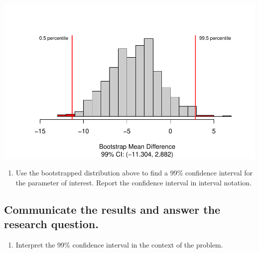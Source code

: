 \documentclass[
]{report}
\newenvironment{Shaded}{\begin{snugshade}}{\end{snugshade}}
\newcommand{\CommentTok}[1]{\textcolor[rgb]{0.56,0.35,0.01}{\textit{#1}}}
\newcommand{\DataTypeTok}[1]{\textcolor[rgb]{0.13,0.29,0.53}{#1}}
\newcommand{\DecValTok}[1]{\textcolor[rgb]{0.00,0.00,0.81}{#1}}
\newcommand{\FloatTok}[1]{\textcolor[rgb]{0.00,0.00,0.81}{#1}}
\newcommand{\KeywordTok}[1]{\textcolor[rgb]{0.13,0.29,0.53}{\textbf{#1}}}
\newcommand{\NormalTok}[1]{#1}
\newcommand{\OperatorTok}[1]{\textcolor[rgb]{0.81,0.36,0.00}{\textbf{#1}}}
\providecommand{\tightlist}{%
  \setlength{\itemsep}{0pt}\setlength{\parskip}{0pt}}
\begin{document}
\begin{Shaded}
\end{Shaded}

\begin{center}\includegraphics[width=0.7\linewidth]{08-paired_files/figure-latex/unnamed-chunk-6-1} \end{center}

\begin{enumerate}
\def\labelenumi{\arabic{enumi}.}
\setcounter{enumi}{18}
\tightlist
\item
  Use the bootstrapped distribution above to find a 99\% confidence interval for the parameter of interest. Report the confidence interval in interval notation.
\end{enumerate}

\vspace{.3in}

\hypertarget{communicate-the-results-and-answer-the-research-question.}{%
\subsection{Communicate the results and answer the research question.}\label{communicate-the-results-and-answer-the-research-question.}}

\begin{enumerate}
\def\labelenumi{\arabic{enumi}.}
\setcounter{enumi}{19}
\tightlist
\item
  Interpret the 99\% confidence interval in the context of the problem.
\end{enumerate}
\end{document}

